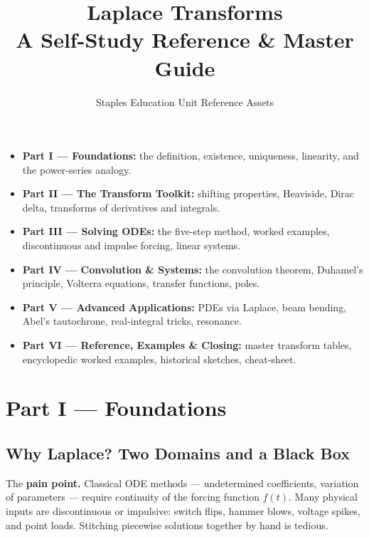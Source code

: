 \documentclass[11pt]{article}
\title{\textbf{\color{headerblue}Laplace Transforms}\\ \large A Self-Study Reference \& Master Guide}
\author{Staples Education Unit Reference Assets}
\date{}
\begin{document}
\maketitle

\begin{topicsbox}
\begin{itemize}[leftmargin=*, itemsep=2pt]
  \item \textbf{Part I --- Foundations:} the definition, existence, uniqueness, linearity, and the power-series analogy.
  \item \textbf{Part II --- The Transform Toolkit:} shifting properties, Heaviside, Dirac delta, transforms of derivatives and integrals.
  \item \textbf{Part III --- Solving ODEs:} the five-step method, worked examples, discontinuous and impulse forcing, linear systems.
  \item \textbf{Part IV --- Convolution \& Systems:} the convolution theorem, Duhamel's principle, Volterra equations, transfer functions, poles.
  \item \textbf{Part V --- Advanced Applications:} PDEs via Laplace, beam bending, Abel's tautochrone, real-integral tricks, resonance.
  \item \textbf{Part VI --- Reference, Examples \& Closing:} master transform tables, encyclopedic worked examples, historical sketches, cheat-sheet.
\end{itemize}
\end{topicsbox}

\tableofcontents

\clearpage
{}
{}
\section*{Part I --- Foundations}
\setcounter{section}{1}
\setcounter{subsection}{0}

\subsection{Why Laplace? Two Domains and a Black Box}

The \textbf{pain point.} Classical ODE methods --- undetermined coefficients, variation of parameters --- require continuity of the forcing function $f(t)$. Many physical inputs are discontinuous or impulsive: switch flips, hammer blows, voltage spikes, and point loads. Stitching piecewise solutions together by hand is tedious.
\end{document}
